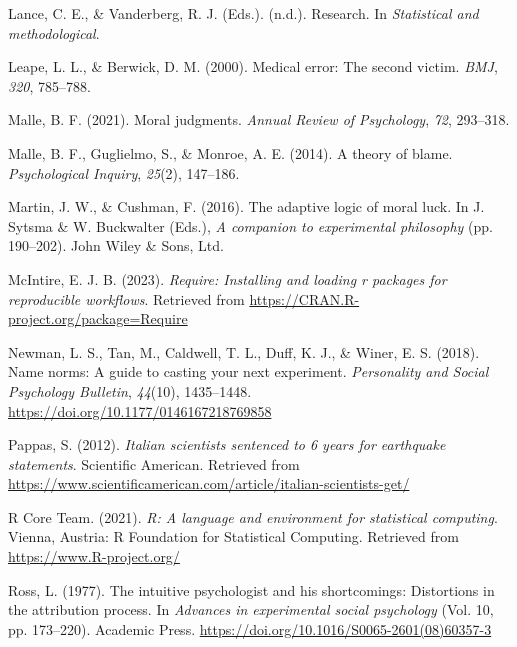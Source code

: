 \documentclass[
  man,floatsintext]{apa6}
\newlength{\cslhangindent}
\newlength{\cslentryspacingunit} %
\newenvironment{CSLReferences}[2] %
 {%
  \setlength{\parindent}{0pt}
  \ifodd #1
  \let\oldpar\par
  \def\par{\hangindent=\cslhangindent\oldpar}
  \fi
  \setlength{\parskip}{#2\cslentryspacingunit}
 }%
 {}
\begin{document}
\begin{CSLReferences}{1}{0}
\leavevmode{}%
Lance, C. E., \& Vanderberg, R. J. (Eds.). (n.d.). Research. In \emph{Statistical and methodological}.

\leavevmode{}%
Leape, L. L., \& Berwick, D. M. (2000). Medical error: The second victim. \emph{BMJ}, \emph{320}, 785--788.

\leavevmode{}%
Malle, B. F. (2021). Moral judgments. \emph{Annual Review of Psychology}, \emph{72}, 293--318.

\leavevmode{}%
Malle, B. F., Guglielmo, S., \& Monroe, A. E. (2014). A theory of blame. \emph{Psychological Inquiry}, \emph{25}(2), 147--186.

\leavevmode{}%
Martin, J. W., \& Cushman, F. (2016). The adaptive logic of moral luck. In J. Sytsma \& W. Buckwalter (Eds.), \emph{A companion to experimental philosophy} (pp. 190--202). John Wiley \& Sons, Ltd.

\leavevmode{}%
McIntire, E. J. B. (2023). \emph{Require: Installing and loading r packages for reproducible workflows}. Retrieved from \url{https://CRAN.R-project.org/package=Require}

\leavevmode{}%
Newman, L. S., Tan, M., Caldwell, T. L., Duff, K. J., \& Winer, E. S. (2018). Name norms: A guide to casting your next experiment. \emph{Personality and Social Psychology Bulletin}, \emph{44}(10), 1435--1448. \url{https://doi.org/10.1177/0146167218769858}

\leavevmode{}%
Pappas, S. (2012). \emph{Italian scientists sentenced to 6 years for earthquake statements}. Scientific American. Retrieved from \url{https://www.scientificamerican.com/article/italian-scientists-get/}

\leavevmode{}%
R Core Team. (2021). \emph{R: A language and environment for statistical computing}. Vienna, Austria: R Foundation for Statistical Computing. Retrieved from \url{https://www.R-project.org/}

\leavevmode{}%
Ross, L. (1977). The intuitive psychologist and his shortcomings: Distortions in the attribution process. In \emph{Advances in experimental social psychology} (Vol. 10, pp. 173--220). Academic Press. \url{https://doi.org/10.1016/S0065-2601(08)60357-3}


\end{CSLReferences}
\end{document}
